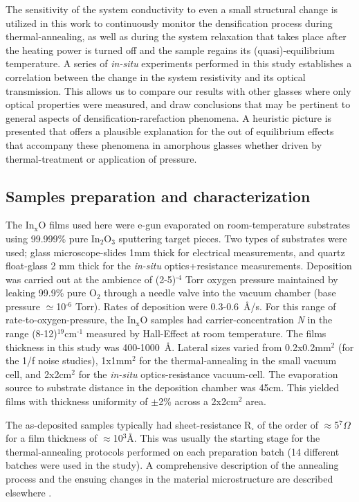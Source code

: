 \documentclass
[preprint,showpacs,byrevtex,10pt,twocolumn,tightenlines,prl,letterpaper]{revtex4}%
\begin{document}
The sensitivity of the system conductivity to even a small structural change
is utilized in this work to continuously monitor the densification process
during thermal-annealing, as well as during the system relaxation that takes
place after the heating power is turned off and the sample regains its
(quasi)-equilibrium temperature. A series of \textit{in-situ} experiments
performed in this study establishes a correlation between the change in the
system resistivity and its optical transmission. This allows us to compare our
results with other glasses where only optical properties were measured, and
draw conclusions that may be pertinent to general aspects of
densification-rarefaction phenomena. A heuristic picture is presented that
offers a plausible explanation for the out of equilibrium effects that
accompany these phenomena in amorphous glasses whether driven by
thermal-treatment or application of pressure.

\subsection{Samples preparation and characterization}

The In$_{\text{x}}$O films used here were e-gun evaporated on room-temperature
substrates using 99.999\% pure In$_{\text{2}}$O$_{\text{3}}$ sputtering target
pieces. Two types of substrates were used; glass microscope-slides 1mm thick
for electrical measurements, and quartz float-glass 2 mm thick for the
\textit{in-situ} optics+resistance measurements. Deposition was carried out at
the ambience of (2-5)$^{\text{-4}}$ Torr oxygen pressure
maintained by leaking 99.9\% pure O$_{\text{2}}$ through a needle valve into
the vacuum chamber (base pressure $\simeq$10$^{\text{-6}}$ Torr). Rates of
deposition were 0.3-0.6~\AA /s. For this range of rate-to-oxygen-pressure, the
In$_{\text{x}}$O samples had carrier-concentration \textit{N} in the range
(8-12)$^{\text{19}}$cm$^{\text{-1}}$ measured by
Hall-Effect at room temperature. The films thickness in this study was
400-1000~\AA . Lateral sizes varied from 0.2x0.2mm$^{\text{2}}$ (for the 1/f
noise studies), 1x1mm$^{\text{2}}$ for the thermal-annealing in the small
vacuum cell, and 2x2cm$^{\text{2}}$ for the \textit{in-situ} optics-resistance
vacuum-cell. The evaporation source to substrate distance in the deposition
chamber was 45cm. This yielded films with thickness uniformity of $\pm$2\%
across a 2x2cm$^{\text{2}}$ area.

The as-deposited samples typically had sheet-resistance R$_{\square}$ of the
order of $\approx$5$^{\text{7}}\Omega$ for a film
thickness of $\approx$10$^{\text{3}}$\AA . This was usually the starting stage
for the thermal-annealing protocols performed on each preparation batch (14
different batches were used in the study). A comprehensive description of the
annealing process and the ensuing changes in the material microstructure are
described elsewhere \cite{15,16}.
\end{document}
